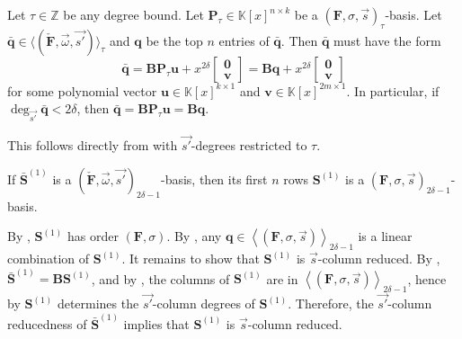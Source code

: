 \begin{cor}
\label{cor:AtauBasisForm}Let $\tau\in\mathbb{Z}$ be any degree bound.
Let $\mathbf{P}_{\tau}\in\mathbb{K}\left[x\right]^{n\times k}$ be
a $\left(\mathbf{F},\sigma,\vec{s}\right)_{\tau}$-basis. Let $\bar{\mathbf{q}}\in\langle(\check{\mathbf{F}},\vec{\omega},\vec{s'})\rangle_{\tau}$
and $\mathbf{q}$ be the top $n$ entries of $\bar{\mathbf{q}}$.
Then $\bar{\mathbf{q}}$ must have the form \[
\bar{\mathbf{q}}=\mathbf{B}\mathbf{P}_{\tau}\mathbf{u}+x^{2\delta}\begin{bmatrix}\mathbf{0}\\
\mathbf{v}\end{bmatrix}=\mathbf{B}\mathbf{q}+x^{2\delta}\begin{bmatrix}\mathbf{0}\\
\mathbf{v}\end{bmatrix}\]
 for some polynomial vector $\mathbf{u}\in\mathbb{K}\left[x\right]^{k\times1}$
and $\mathbf{v}\in\mathbb{K}\left[x\right]^{2m\times1}$. In particular,
if $\deg_{\vec{s'}}\bar{\mathbf{q}}<2\delta$, then $\bar{\mathbf{q}}=\mathbf{B}\mathbf{P}_{\tau}\mathbf{u}=\mathbf{B}\mathbf{q}$. \end{cor}
\begin{pf}
This follows directly from  with $\vec{s'}$-degrees
restricted to $\tau$.\end{pf}
\begin{lem}
\label{lem:2delta-1Basis}If $\bar{\mathbf{S}}^{\left(1\right)}$
is a $(\check{\mathbf{F}},\vec{\omega},\vec{s'})_{2\delta-1}$-basis,
then its first $n$ rows $\mathbf{S}^{\left(1\right)}$ is a $\left(\mathbf{F},\sigma,\vec{s}\right)_{2\delta-1}$-basis.\end{lem}
\begin{pf}
By , $\mathbf{S}^{\left(1\right)}$ has
order $\left(\mathbf{F},\sigma\right)$. By ,
any $\mathbf{q}\in\left\langle \left(\mathbf{F},\sigma,\vec{s}\right)\right\rangle _{2\delta-1}$
is a linear combination of $\mathbf{S}^{\left(1\right)}$. It remains
to show that $\mathbf{S}^{\left(1\right)}$ is $\vec{s}$-column reduced.
By , $\bar{\mathbf{S}}^{\left(1\right)}=\mathbf{B}\mathbf{S}^{\left(1\right)}$,
and by , the columns of $\mathbf{S}^{\left(1\right)}$
are in $\left\langle \left(\mathbf{F},\sigma,\vec{s}\right)\right\rangle _{2\delta-1}$,
hence by  $\mathbf{S}^{\left(1\right)}$
determines the $\vec{s'}$-column degrees of $\mathbf{S}^{\left(1\right)}$.
Therefore, the $\vec{s'}$-column reducedness of $\bar{\mathbf{S}}^{\left(1\right)}$
implies that $\mathbf{S}^{\left(1\right)}$ is $\vec{s}$-column reduced.\end{pf}
